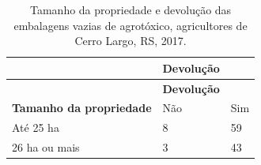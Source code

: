 \documentclass[12pt,portuguese,oneside]{book}
\begin{document}
\begin{longtable}[]{@{}lll@{}}
\caption{\label{tab:tamprop1}Tamanho da propriedade e devolução das
embalagens vazias de agrotóxico, agricultores de Cerro Largo, RS,
2017.}\tabularnewline
\toprule
\begin{minipage}[b]{0.37\columnwidth}\raggedright\strut
\strut
\end{minipage} & \begin{minipage}[b]{0.34\columnwidth}\raggedright\strut
\textbf{Devolução}\strut
\end{minipage} & \begin{minipage}[b]{0.14\columnwidth}\raggedright\strut
\strut
\end{minipage}\tabularnewline
\midrule
\endfirsthead
\toprule
\begin{minipage}[b]{0.37\columnwidth}\raggedright\strut
\strut
\end{minipage} & \begin{minipage}[b]{0.34\columnwidth}\raggedright\strut
\textbf{Devolução}\strut
\end{minipage} & \begin{minipage}[b]{0.14\columnwidth}\raggedright\strut
\strut
\end{minipage}\tabularnewline
\midrule
\endhead
\begin{minipage}[t]{0.37\columnwidth}\raggedright\strut
\textbf{Tamanho da propriedade}\strut
\end{minipage} & \begin{minipage}[t]{0.34\columnwidth}\raggedright\strut
Não\strut
\end{minipage} & \begin{minipage}[t]{0.14\columnwidth}\raggedright\strut
Sim\strut
\end{minipage}\tabularnewline
\begin{minipage}[t]{0.37\columnwidth}\raggedright\strut
Até 25 ha\strut
\end{minipage} & \begin{minipage}[t]{0.34\columnwidth}\raggedright\strut
8\strut
\end{minipage} & \begin{minipage}[t]{0.14\columnwidth}\raggedright\strut
59\strut
\end{minipage}\tabularnewline
\begin{minipage}[t]{0.37\columnwidth}\raggedright\strut
26 ha ou mais\strut
\end{minipage} & \begin{minipage}[t]{0.34\columnwidth}\raggedright\strut
3\strut
\end{minipage} & \begin{minipage}[t]{0.14\columnwidth}\raggedright\strut
43\strut
\end{minipage}\tabularnewline
\bottomrule
\end{longtable}
\end{document}
